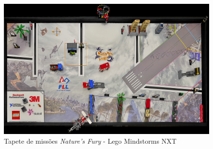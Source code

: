 \FloatBarrier
\begin{figure}[!h]
\centering
\includegraphics[keepaspectratio=true,scale=0.5]{figuras/natureFury.png}
\caption{Tapete de missões \textit{Nature's Fury} - Lego Mindstorms NXT}
\label{natureFury}
\end{figure}

 
